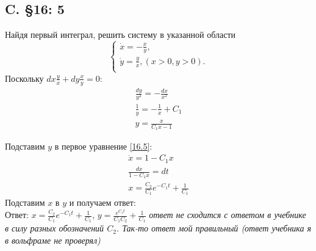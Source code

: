 \documentclass{article}
\begin{document}
\subsection{C. \S16: 5}
Найдя первый интеграл, решить систему в указанной области
\begin{equation}\label{16.5}
    \begin{cases}
        \dot x = - \frac{x}{y},\\
        \dot y = \frac{y}{x}, (x>0,y>0).\\
    \end{cases}
\end{equation}
Поскольку $dx \frac{y}{x}+dy \frac{x}{y}=0$:
\begin{gather*}
    \frac{dy}{y^2}=-\frac{dx}{x^2}\\
    \frac{1}{y}=-\frac{1}{x}+C_1\\
    y = \frac{x}{C_1 x - 1}
\end{gather*}

Подставим $y$ в первое уравнение \ref{16.5}:
\begin{gather*}
    \dot x = 1-C_1 x\\
    \frac{dx}{1-C_1x}=dt\\
    x=\frac{C_2}{C_1}e^{-C_1t}+\frac{1}{C_1}
\end{gather*}
Подставим $x$ в $y$ и получаем ответ:\\
Ответ: $x=\frac{C_2}{C_1}e^{-C_1t} + \frac{1}{C_1}$, $y=  \frac{e^{C_1t}}{C_1 C_2} + \frac{1}{C_1} $
 \textcolor[rgb]{0.480469,0.566406,0.480469}{\textit{ответ не сходится с ответом в учебнике в силу разных обозначений $C_2$. Так-то ответ мой правильный (ответ учебника я в вольфраме не проверял)}}                                               
\end{document}

